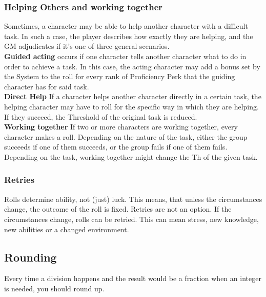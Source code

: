 \subsubsection{Helping Others and working together}\label{subsubsec:helping}
Sometimes, a character may be able to help another character with a difficult task.
In such a case, the player describes how exactly they are helping, and the GM adjudicates if it's one of three general scenarios.\\
\textbf{Guided acting} occurs if one character tells another character what to do in order to achieve a task.
In this case, the acting character may add a bonus set by the System to the roll for every rank of Proficiency Perk that the guiding character has for said task.\\
\textbf{Direct Help} If a character helps another character directly in a certain task, the helping character may have to roll for the specific way in which they are helping.
If they succeed, the Threshold of the original task is reduced.\\
\textbf{Working together} If two or more characters are working together, every character makes a roll.
Depending on the nature of the task, either the group succeeds if one of them succeeds, or the group fails if one of them fails.\\
Depending on the task, working together might change the Th of the given task.\\

\subsubsection{Retries}\label{subsubsec:retries}
Rolls determine ability, not (just) luck.
This means, that unless the circumstances change, the outcome of the roll is fixed.
Retries are not an option.
If the circumstances change, rolls can be retried.
This can mean stress, new knowledge, new abilities or a changed environment.


\subsection{Rounding}\label{subsec:rounding}
Every time a division happens and the result would be a fraction when an integer is needed, you should round up.

